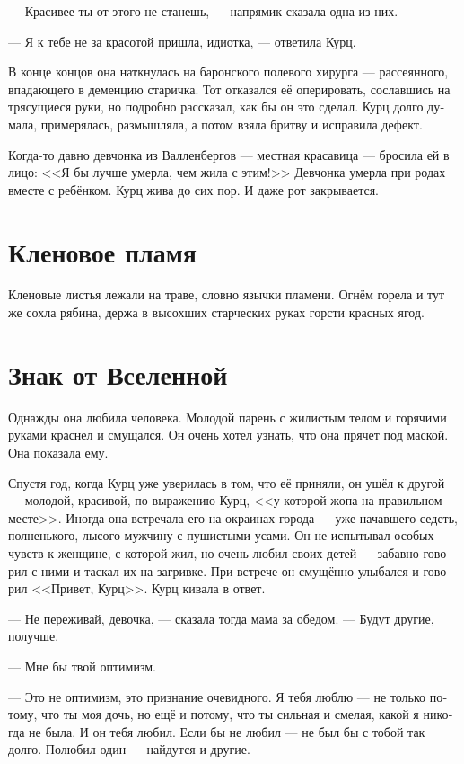 \documentclass[a4paper,10pt,fleqn]{book}\usepackage{polyglossia}\setdefaultlanguage[babelshorthands=true]{russian}\setotherlanguage{english}\defaultfontfeatures{Ligatures=TeX,Mapping=tex-text}\usepackage{xcolor}\newcommand{\ml}[3]{#2}
\begin{document}
--- Красивее ты от этого не станешь, --- напрямик сказала одна из них.

--- Я к тебе не за красотой пришла, идиотка, --- ответила Курц.

В конце концов она наткнулась на баронского полевого хирурга --- рассеянного, впадающего в деменцию старичка.
Тот отказался её оперировать, сославшись на трясущиеся руки, но подробно рассказал, как бы он это сделал.
Курц долго думала, примерялась, размышляла, а потом взяла бритву и исправила дефект.

Когда-то давно девчонка из Валленбергов --- местная красавица --- бросила ей в лицо:
<<Я бы лучше умерла, чем жила с этим!>>
Девчонка умерла при родах вместе с ребёнком.
Курц жива до сих пор.
И даже рот закрывается.

\section{Кленовое пламя}

Кленовые листья лежали на траве, словно язычки пламени.
Огнём горела и тут же сохла рябина, держа в высохших старческих руках горсти красных ягод.

\section{Знак от Вселенной}

Однажды она любила человека.
Молодой парень с жилистым телом и горячими руками краснел и смущался.
Он очень хотел узнать, что она прячет под маской.
Она показала ему.

Спустя год, когда Курц уже уверилась в том, что её приняли, он ушёл к другой --- молодой, красивой, по выражению Курц, <<у которой жопа на правильном месте>>.
Иногда она встречала его на окраинах города --- уже начавшего седеть, полненького, лысого мужчину с пушистыми усами.
Он не испытывал особых чувств к женщине, с которой жил, но очень любил своих детей --- забавно говорил с ними и таскал их на загривке.
При встрече он смущённо улыбался и говорил <<Привет, Курц>>.
Курц кивала в ответ.

--- Не переживай, девочка, --- сказала тогда мама за обедом.
--- Будут другие, получше.

--- Мне бы твой оптимизм.

--- Это не оптимизм, это признание очевидного.
Я тебя люблю --- не только потому, что ты моя дочь, но ещё и потому, что ты сильная и смелая, какой я никогда не была.
И он тебя любил.
Если бы не любил --- не был бы с тобой так долго.
Полюбил один --- найдутся и другие.
\end{document}
